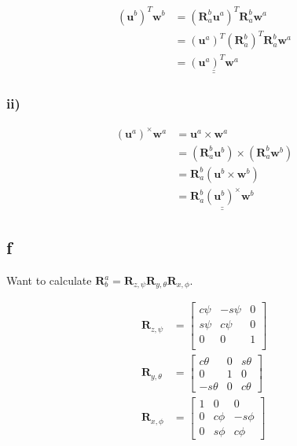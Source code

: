 \documentclass{article}
\begin{document}
\begin{align*}
    (\mathbf{u}^b)^T\mathbf{w}^b &= (\mathbf{R}_a^b\mathbf{u}^a)^T\mathbf{R}_a^b\mathbf{w}^a\\
                                 &= (\mathbf{u}^a)^T (\mathbf{R}_a^b)^T\mathbf{R}_a^b\mathbf{w}^a\\
                                 &= \underline{\underline{(\mathbf{u}^a)^T\mathbf{w}^a}}
\end{align*}

\subsubsection*{ii)}

\begin{align*}
    (\mathbf{u}^a)^\times\mathbf{w}^a &= \mathbf{u}^a\times\mathbf{w}^a\\
                                      &= (\mathbf{R}_a^b\mathbf{u}^b)\times(\mathbf{R}_a^b\mathbf{w}^b)\\
                                      &= \mathbf{R}_a^b(\mathbf{u}^b\times\mathbf{w}^b)\\
                                      &= \underline{\underline{\mathbf{R}_a^b(\mathbf{u}^b)^\times\mathbf{w}^b}}
\end{align*}

\subsection{f}

Want to calculate $\mathbf{R}_b^a = \mathbf{R}_{z,\psi} \mathbf{R}_{y,\theta} \mathbf{R}_{x,\phi}$.

\begin{align*}
    \mathbf{R}_{z,\psi} &= \begin{bmatrix}
    c\psi & -s\psi & 0 \\
    s\psi & c\psi & 0 \\
    0 & 0 & 1 \\
    \end{bmatrix}\\
    \mathbf{R}_{y,\theta} &= \begin{bmatrix}
    c\theta & 0 & s\theta \\
    0 & 1 & 0 \\
    -s\theta & 0 & c\theta
    \end{bmatrix}\\
    \mathbf{R}_{x,\phi} &= \begin{bmatrix}
    1 & 0 & 0 \\
    0 & c\phi & -s\phi \\
    0 & s\phi & c\phi
    \end{bmatrix} \\
\end{align*}
\end{document}
